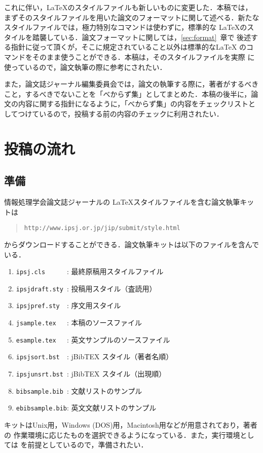 \documentclass[submit,techrep,noauthor]{ipsj}
\def\|{\verb|}
\begin{document}
これに伴い，\LaTeX のスタイルファイルも新しいものに変更した．本稿では，
まずそのスタイルファイルを用いた論文のフォーマットに関して述べる．新たな
スタイルファイルでは，極力特別なコマンドは使わずに，標準的な \LaTeX のス
タイルを踏襲している．論文フォーマットに関しては，\ref{sec:format}~章で
後述する指針に従って頂くが，そこに規定されていること以外は標準的な\LaTeX
のコマンドをそのまま使うことができる．本稿は，そのスタイルファイルを実際
に使っているので，論文執筆の際に参考にされたい．



また，論文誌ジャーナル編集委員会では，論文の執筆する際に，著者がするべき
こと，するべきでないことを「べからず集」としてまとめた．本稿の後半に，論
文の内容に関する指針になるように，「べからず集」の内容をチェックリストと
してつけているので，投稿する前の内容のチェックに利用されたい．

%2
\section{投稿の流れ}

%2.1
\subsection{準備}

情報処理学会論文誌ジャーナルの \LaTeX スタイルファイルを含む論文執筆キッ
トは
\begin{quote}
    \small
    \|http://www.ipsj.or.jp/jip/submit/style.html|
\end{quote}
からダウンロードすることができる．論文執筆キットは以下のファイルを含んで
いる．
\begin{enumerate}
    \item \|ipsj.cls      |: 最終原稿用スタイルファイル
    \item \|ipsjdraft.sty |: 投稿用スタイル（査読用）
    \item \|ipsjpref.sty  |: 序文用スタイル
    \item \|jsample.tex   |: 本稿のソースファイル
    \item \|esample.tex   |: 英文サンプルのソースファイル
    \item \|ipsjsort.bst  |: jBibTEX スタイル（著者名順）
    \item \|ipsjunsrt.bst |: jBibTEX スタイル（出現順）
    \item \|bibsample.bib |: 文献リストのサンプル
    \item \|ebibsample.bib|: 英文文献リストのサンプル
\end{enumerate}
キットはUnix用，Windows (DOS)用，Macintosh用などが用意されており，著者の
作業環境に応じたものを選択できるようになっている．また，実行環境としては
\LaTeXe を前提としているので，準備されたい．
\end{document}
